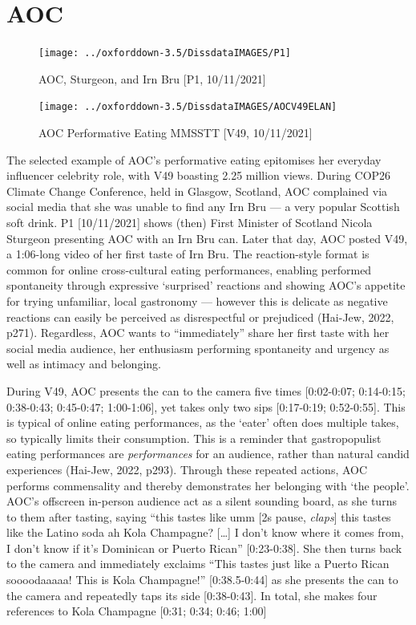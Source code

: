 \documentclass[a4paper, nobind]{templates/ociamthesis}
\begin{document}
\hypertarget{aoc-2}{%
\section*{AOC}\label{aoc-2}}

\begin{figure}
\texttt{[image: ../oxforddown-3.5/DissdataIMAGES/P1]} \caption{AOC, Sturgeon, and Irn Bru [P1, 10/11/2021]}\label{fig:unnamed-chunk-28}
\end{figure}

\begin{figure}
\texttt{[image: ../oxforddown-3.5/DissdataIMAGES/AOCV49ELAN]} \caption{AOC Performative Eating MMSSTT [V49, 10/11/2021]}\label{fig:unnamed-chunk-29}
\end{figure}

The selected example of AOC's performative eating epitomises her everyday influencer celebrity role, with V49 boasting 2.25 million views. During COP26 Climate Change Conference, held in Glasgow, Scotland, AOC complained via social media that she was unable to find any Irn Bru --- a very popular Scottish soft drink. P1 {[}10/11/2021{]} shows (then) First Minister of Scotland Nicola Sturgeon presenting AOC with an Irn Bru can. Later that day, AOC posted V49, a 1:06-long video of her first taste of Irn Bru. The reaction-style format is common for online cross-cultural eating performances, enabling performed spontaneity through expressive `surprised' reactions and showing AOC's appetite for trying unfamiliar, local gastronomy --- however this is delicate as negative reactions can easily be perceived as disrespectful or prejudiced (Hai-Jew, 2022, p271). Regardless, AOC wants to ``immediately'' share her first taste with her social media audience, her enthusiasm performing spontaneity and urgency as well as intimacy and belonging.

During V49, AOC presents the can to the camera five times {[}0:02-0:07; 0:14-0:15; 0:38-0:43; 0:45-0:47; 1:00-1:06{]}, yet takes only two sips {[}0:17-0:19; 0:52-0:55{]}. This is typical of online eating performances, as the `eater' often does multiple takes, so typically limits their consumption. This is a reminder that gastropopulist eating performances are \emph{performances} for an audience, rather than natural candid experiences (Hai-Jew, 2022, p293). Through these repeated actions, AOC performs commensality and thereby demonstrates her belonging with `the people'. AOC's offscreen in-person audience act as a silent sounding board, as she turns to them after tasting, saying ``this tastes like umm {[}2s pause, \emph{claps}{]} this tastes like the Latino soda ah Kola Champagne? {[}\ldots{]} I don't know where it comes from, I don't know if it's Dominican or Puerto Rican'' {[}0:23-0:38{]}. She then turns back to the camera and immediately exclaims ``This tastes just like a Puerto Rican soooodaaaaa! This is Kola Champagne!'' {[}0:38.5-0:44{]} as she presents the can to the camera and repeatedly taps its side {[}0:38-0:43{]}. In total, she makes four references to Kola Champagne {[}0:31; 0:34; 0:46; 1:00{]}
\end{document}
